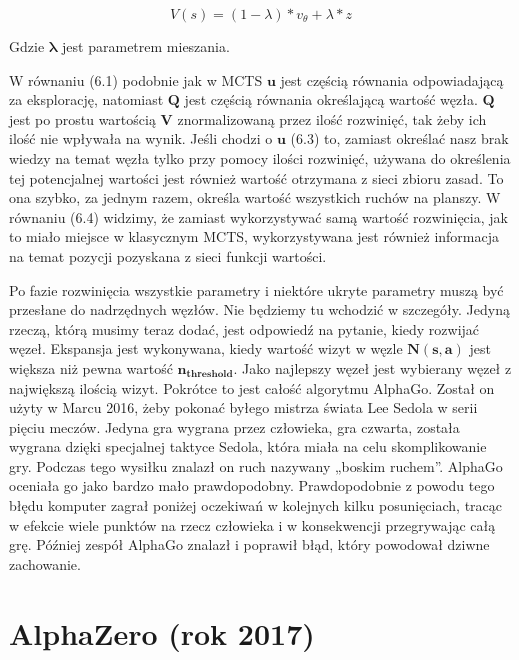 \begin{equation}
V(s) = (1 - \lambda) * v_\theta + \lambda * z
\end{equation}

\noindent Gdzie $\boldsymbol{\lambda}$ jest parametrem mieszania.\newline

W równaniu (6.1) podobnie jak w MCTS $\boldsymbol{u}$ jest częścią równania odpowiadającą za eksplorację, natomiast $\boldsymbol{Q}$ jest częścią równania określającą wartość węzła. $\boldsymbol{Q}$ jest po prostu wartością $\boldsymbol{V}$ znormalizowaną przez ilość rozwinięć, tak żeby ich ilość nie wpływała na wynik. Jeśli chodzi o $\boldsymbol{u}$ (6.3) to, zamiast określać nasz brak wiedzy na temat węzła tylko przy pomocy ilości rozwinięć, używana do określenia tej potencjalnej wartości jest również wartość otrzymana z sieci zbioru zasad. To ona szybko, za jednym razem, określa wartość wszystkich ruchów na planszy. W równaniu (6.4) widzimy, że zamiast wykorzystywać samą wartość rozwinięcia, jak to miało miejsce w klasycznym MCTS, wykorzystywana jest również informacja na temat pozycji pozyskana z sieci funkcji wartości.\newline

Po fazie rozwinięcia wszystkie parametry i niektóre ukryte parametry muszą być przesłane do nadrzędnych węzłów. Nie będziemy tu wchodzić w szczegóły. Jedyną rzeczą, którą musimy teraz dodać, jest odpowiedź na pytanie, kiedy rozwijać węzeł. Ekspansja jest wykonywana, kiedy wartość wizyt w węzle $\boldsymbol{N(s, a)}$ jest większa niż pewna wartość $\boldsymbol{n_{threshold}}$. Jako najlepszy węzeł jest wybierany węzeł z największą ilością wizyt. Pokrótce to jest całość algorytmu AlphaGo. Został on użyty w Marcu 2016, żeby pokonać byłego mistrza świata Lee Sedola w serii pięciu meczów. Jedyna gra wygrana przez człowieka, gra czwarta, została wygrana dzięki specjalnej taktyce Sedola, która miała na celu skomplikowanie gry. Podczas tego wysiłku znalazł on ruch nazywany „boskim ruchem”. AlphaGo oceniała go jako bardzo mało prawdopodobny. Prawdopodobnie z powodu tego błędu komputer zagrał poniżej oczekiwań w kolejnych kilku posunięciach, tracąc w efekcie wiele punktów na rzecz człowieka i w konsekwencji przegrywając całą grę. Później zespół AlphaGo znalazł i poprawił błąd, który powodował dziwne zachowanie.

\section{AlphaZero (rok 2017)}

